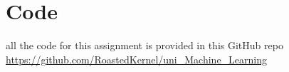 \documentclass[10pt,twocolumn,letterpaper]{article}
\begin{document}
\section{Code}

all the code for this assignment is provided in this GitHub repo 
\url{https://github.com/RoastedKernel/uni_Machine_Learning}
 

\end{document}
